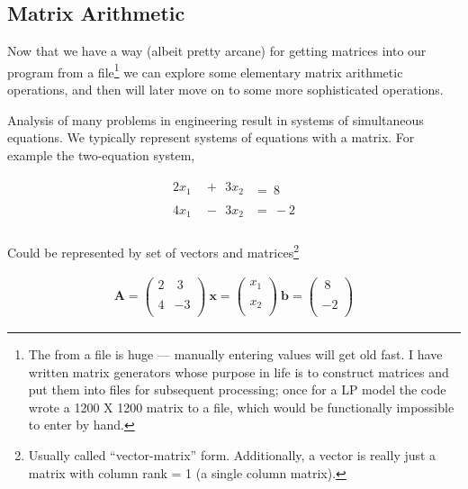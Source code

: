 \subsection{Matrix Arithmetic}
Now that we have a way (albeit pretty arcane) for getting matrices into our program from a file\footnote{The from a file is huge --- manually entering values will get old fast.   I have written matrix generators whose purpose in life is to construct matrices and put them into files for subsequent processing; once for a LP model the code wrote a 1200 X 1200 matrix to a file, which would be functionally impossible to enter by hand.} we can explore some elementary matrix arithmetic operations, and then will later move on to some more sophisticated operations.

Analysis of many problems in engineering result in systems of simultaneous equations.  
We typically represent systems of equations with a matrix.  
For example the two-equation system,

\begin{gather}
\begin{matrix}
2x_1 & ~+~~3x_2  \\
~\\
4x_1 & ~-~~3x_2 \\
\end{matrix}
\begin{matrix}
=~8\\
~\\
=~-2\\
\end{matrix}
\end{gather}

Could be represented by set of vectors and matrices\footnote{Usually called ``vector-matrix'' form.   Additionally, a vector is really just a matrix with column rank = 1 (a single column matrix).}

\begin{gather}
\mathbf{A} =
\begin{pmatrix}
2 & ~3 \\
~\\
4 & -3 \\
\end{pmatrix}
~
\mathbf{x} =
\begin{pmatrix}
x_1\\
~\\
x_2\\
\end{pmatrix}
~
\mathbf{b} =
\begin{pmatrix}
~8\\
~\\
-2\\
\end{pmatrix}
\end{gather}

